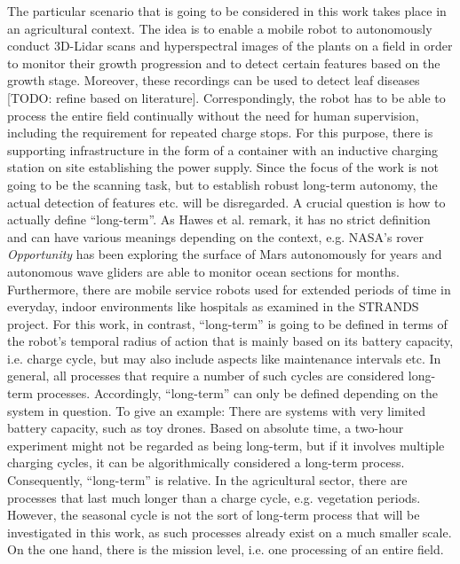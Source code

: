 \documentclass[english, master, utf8]{base/thesis_KBS}
\begin{document}
The particular scenario that is going to be considered in this work takes place in an agricultural context.
The idea is to enable a mobile robot to autonomously conduct 3D-Lidar scans and hyperspectral images of the plants on a field in order to monitor their growth progression and 
to detect certain features based on the growth stage. Moreover, these recordings can be used to detect leaf diseases [TODO: refine based on literature].
Correspondingly, the robot has to be able to process the entire field continually without the need for human supervision,
including the requirement for repeated charge stops. For this purpose, there is supporting infrastructure in the form of a container with an inductive charging station on site
establishing the power supply. Since the focus of the work is not going to be the scanning task, but to establish robust long-term autonomy, the actual detection of features 
etc. will be disregarded.
A crucial question is how to actually define ``long-term''. As Hawes et al. remark, it has no strict definition and can have various meanings depending
on the context, e.g. NASA's rover \textit{Opportunity} has been exploring the surface of Mars autonomously for years and autonomous wave gliders are able to monitor
ocean sections for months. Furthermore, there are mobile service robots used for extended periods of time in everyday, indoor environments like hospitals 
as examined in the STRANDS project. \cite{Hawes:2017}
For this work, in contrast, ``long-term'' is going to be defined in terms of the robot's temporal radius of action that is mainly based on its battery capacity, i.e. charge cycle,
but may also include aspects like maintenance intervals etc. In general, all processes that require a number of such cycles are considered long-term processes.
Accordingly, ``long-term'' can only be defined depending on the system in question. To give an example: There are systems with very limited battery capacity, 
such as toy drones. Based on absolute time, a two-hour experiment might not be regarded as being long-term, but if it involves multiple charging cycles, it can be 
algorithmically considered a long-term process. Consequently, ``long-term'' is relative.\newline
In the agricultural sector, there are processes that last much longer than a charge cycle, e.g. vegetation periods.
However, the seasonal cycle is not the sort of long-term process that will be investigated in this work, as such processes already exist on a much smaller scale.
On the one hand, there is the mission level, i.e. one processing of an entire field. 
\end{document}
